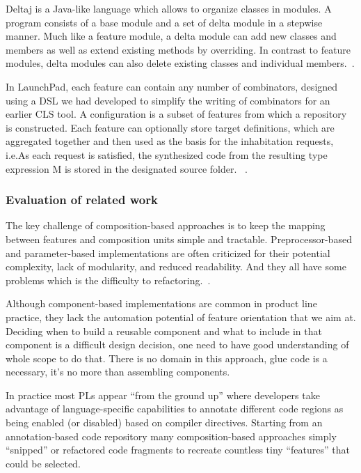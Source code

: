 Deltaj is a Java-like language which allows to organize classes in modules. A program consists of a base
 module and a set of delta module in a stepwise manner. Much like a feature module, a delta module can add
 new classes and members as well as extend existing methods by overriding. In contrast to feature modules,
 delta modules can also delete existing classes and individual members.~\cite{Schaefer:2010:DPS:1885639.1885647}.

In LaunchPad, each feature can contain any number of combinators, designed using a DSL we had developed to
simplify the writing of combinators for an earlier CLS tool. A configuration is a subset of features from
which a repository is constructed. Each feature can optionally store target definitions, which are aggregated
 together and then used as the basis for the inhabitation requests, i.e.As each request is satisfied, the
 synthesized code from the resulting type expression M is stored in the designated source folder.
~\cite{Heineman:2015:TMO:2791060.2791076}.

\subsubsection{Evaluation of related work}

The key challenge of composition-based approaches is to keep the mapping between features and composition units
simple and tractable. Preprocessor-based and parameter-based implementations are often criticized for their
potential complexity, lack of modularity, and reduced readability. And they all have some problems which is the
difficulty to refactoring.~\cite{Kim:2017:RJS:3106195.3106201}.

Although component-based implementations are common in product line practice, they lack the automation potential
of feature orientation that we aim at. Deciding when to build a reusable component and what to include in
that component is a difficult design decision, one need to have good understanding of whole scope to do that.
There is no domain in this approach, glue code is a necessary, it's no more than assembling components.
~\cite{Apel:2013:FSP:2541773}

In practice most PLs appear “from the ground up” where developers take advantage of language-specific capabilities
 to annotate different code regions as being enabled (or disabled) based on compiler directives. Starting from an
 annotation-based code repository many composition-based approaches simply “snipped” or refactored code fragments
 to recreate countless tiny “features” that could be selected.


